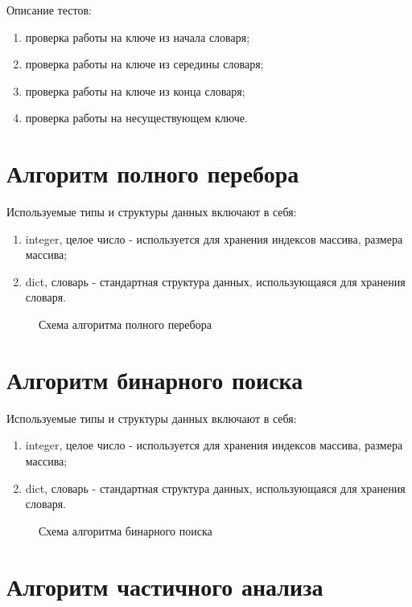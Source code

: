 Описание тестов:
\begin{enumerate}
	\item проверка работы на ключе из начала словаря;
	\item проверка работы на ключе из середины словаря;
	\item проверка работы на ключе из конца словаря;
	\item проверка работы на несуществующем ключе.
\end{enumerate}

\section{Алгоритм полного перебора}

Используемые типы и структуры данных включают в себя:
\begin{enumerate}
	\item integer, целое число - используется для хранения индексов массива, размера массива;
	\item dict, словарь - стандартная структура данных, использующаяся для хранения словаря.
\end{enumerate}

\newpage

\begin{figure}[ph!]
	\caption{Схема алгоритма полного перебора}
\end{figure}

\section{Алгоритм бинарного поиска}

Используемые типы и структуры данных включают в себя:
\begin{enumerate}
	\item integer, целое число - используется для хранения индексов массива, размера массива;
	\item dict, словарь - стандартная структура данных, использующаяся для хранения словаря.
\end{enumerate}


\begin{figure}[ph!]
	\caption{Схема алгоритма бинарного поиска}
\end{figure}

\newpage

\section{Алгоритм частичного анализа}

